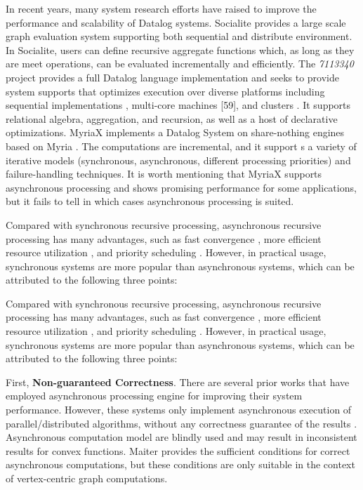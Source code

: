 \documentclass{vldb}
\begin{document}
In recent years, many system research efforts have raised to improve the performance and scalability of Datalog systems. Socialite \cite{socialite} provides a large scale graph evaluation system supporting both sequential and distribute environment. In Socialite, users can define recursive aggregate functions which, as long as they are meet operations, can be evaluated incrementally and efficiently. The \textit{7113340} project provides a full Datalog language implementation and seeks to provide  system supports that optimizes execution over diverse platforms including sequential implementations \cite{Shkapsky:2016:BDA:2882903.2915229}, multi-core machines [59], and clusters \cite{bigdatalog}. It supports relational algebra, aggregation, and recursion, as well as a host of declarative optimizations. MyriaX \cite{Halperin:2014:DMB:2588555.2594530} implements a Datalog System on share-nothing engines based on Myria \cite{}. The computations are incremental, and it support s a variety of iterative models (synchronous, asynchronous, different processing priorities) and failure-handling techniques. It is worth mentioning that MyriaX supports asynchronous processing and shows promising performance for some applications, but it fails to tell in which cases asynchronous processing is suited.

Compared with synchronous recursive processing, asynchronous recursive processing has many advantages, such as fast convergence \cite{}, more efficient resource utilization \cite{}, and priority scheduling \cite{}. However, in practical usage, synchronous systems are more popular than asynchronous systems, which can be attributed to the following three points:

Compared with synchronous recursive processing, asynchronous recursive processing has many advantages, such as fast convergence \cite{}, more efficient resource utilization \cite{}, and priority scheduling \cite{}. However, in practical usage, synchronous systems are more popular than asynchronous systems, which can be attributed to the following three points:

First, \textbf{Non-guaranteed Correctness}. There are several prior works that have employed asynchronous processing engine for improving their system performance. However, these systems only implement asynchronous execution of parallel/distributed algorithms, without any correctness guarantee of the results \cite{}. Asynchronous computation model are blindly used and may result in inconsistent results for convex functions. Maiter \cite{} provides the sufficient conditions for correct asynchronous computations, but these conditions are only suitable in the context of vertex-centric graph computations.
\end{document}
